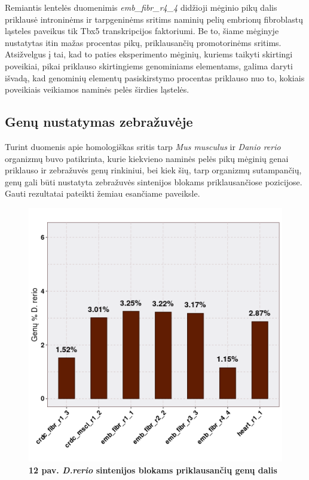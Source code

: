 \documentclass[12pt]{article}
\begin{document}
Remiantis lentelės duomenimis \emph{emb\_fibr\_r4\_4} didžioji mėginio pikų
dalis priklausė introninėms ir tarpgeninėms sritims naminių pelių embrionų
fibroblastų ląsteles paveikus tik Tbx5 transkripcijos faktoriumi. Be to, šiame
mėginyje nustatytas itin mažas procentas pikų, prik\-lau\-san\-čių promotorinėms
sritims. Atsižvelgus į tai, kad to paties eksperimento mėginių, kuriems taikyti
skirtingi poveikiai, pikai priklauso skirtingiems genominiams elementams, galima
daryti išvadą, kad genominių elementų pasiskirstymo procentas priklauso nuo to,
kokiais poveikiais veikiamos naminės pelės širdies ląstelės.

\newpage

\subsection{Genų nustatymas zebražuvėje}
Turint duomenis apie homologiškas sritis tarp \emph{Mus musculus} ir
\emph{Danio rerio} organizmų buvo patikrinta, kurie kiekvieno naminės pelės pikų
mėginių genai priklauso ir zebražuvės genų rinkiniui, bei kiek šių, tarp
organizmų sutampančių, genų gali būti nustatyta zebražuvės sintenijos blokams
priklausančiose pozicijose. Gauti rezultatai pateikti žemiau esančiame
paveiksle.

\begin{figure}[htb]
    \begin{center}
        \includegraphics[width=0.7\linewidth]{../Figures/Unique_genes_DR.png}
        \vspace{-2\baselineskip}
        \caption*{\small\textbf{12 pav. \emph{D.rerio} sintenijos blokams
                                priklausančių genų dalis}}
        \label{fig:12}
    \end{center}
\end{figure}
\end{document}
